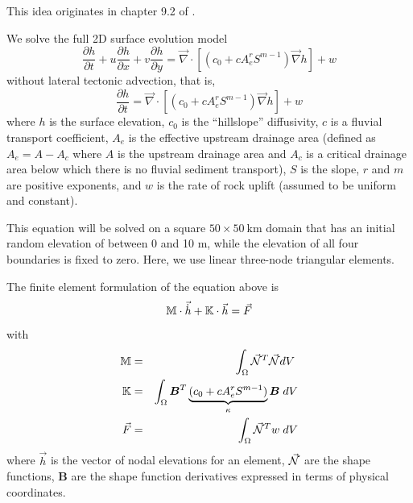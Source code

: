 
This \stone idea originates in chapter 9.2 of \textcite{simp17}. 

We solve the full 2D surface evolution model 
\begin{equation}
\frac{\partial h}{\partial t}
+ u \frac{\partial h}{\partial x}
+ v \frac{\partial h}{\partial y}
= \vec\nabla\cdot \left[ (c_0 + c A_e^r S^{m-1}) \vec\nabla h \right] + w
\end{equation}
without lateral tectonic advection, that is,
\begin{equation}
\frac{\partial h}{\partial t}
= \vec\nabla\cdot \left[ (c_0 + c A_e^r S^{m-1}) \vec\nabla h \right] + w
\end{equation}
where $h$ is the surface elevation, 
$c_0$ is the ``hillslope'' diffusivity, 
$c$ is a fluvial transport coefficient, $A_e$ 
is the effective upstream drainage area (defined as $A_e = A - A_c$ 
where $A$ is the upstream drainage
area and $A_c$ is a critical drainage area below which there is no fluvial sediment transport),
$S$ is the slope, 
$r$ and $m$ are positive exponents, and $w$ is the rate of rock uplift (assumed to be uniform and constant).

This equation will be solved on a square $50\times 50~\si{\km}$ 
domain that has an initial random elevation of
between 0 and 10 m, while the elevation of all four boundaries is fixed to zero. 
Here, we use linear three-node triangular elements.

The finite element formulation of the equation above is 
\[
{\mathbb{M}} \cdot \vec{\dot h} + {\mathbb{K}} \cdot \vec{h} = \vec{F} 
\]
with 
\begin{eqnarray}
{\mathbb{M}} &=& \int_\Omega \vec{{\mathcal{N}}}^T \vec{{\mathcal{N}}} dV \; \nonumber\\
{\mathbb{K}} &=& \int_\Omega {\bm B}^T \underbrace{(c_0 + c A_e^r S^{m-1})}_{\kappa}  {\bm B} \;  dV \nonumber\\
\vec{F} &=& \int_\Omega  \vec{{\mathcal{N}}}^T w \; dV
\end{eqnarray}
where $\vec{h}$ is the vector of nodal elevations for an element, $\vec{{\mathcal{N}}}$ 
are the shape functions, ${\bm B}$ are the shape function derivatives expressed 
in terms of physical coordinates.

